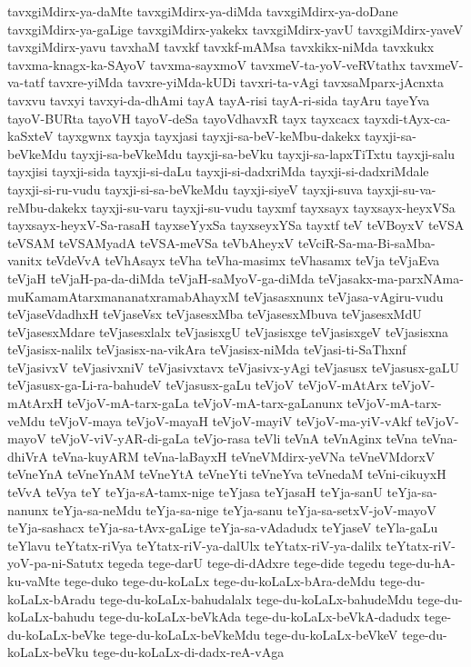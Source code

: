 {tavxgiMdirx-ya-daMte
tavxgiMdirx-ya-diMda
tavxgiMdirx-ya-doDane
tavxgiMdirx-ya-gaLige
tavxgiMdirx-yakekx
tavxgiMdirx-yavU
tavxgiMdirx-yaveV
tavxgiMdirx-yavu
tavxhaM
tavxkf
tavxkf-mAMsa
tavxkikx-niMda
tavxkukx
tavxma-knagx-ka-SAyoV
tavxma-sayxmoV
tavxmeV-ta-yoV-veRVtathx
tavxmeV-va-tatf
tavxre-yiMda
tavxre-yiMda-kUDi
tavxri-ta-vAgi
tavxsaMparx-jAcnxta
tavxvu
tavxyi
tavxyi-da-dhAmi
tayA
tayA-risi
tayA-ri-sida
tayAru
tayeYva
tayoV-BURta
tayoVH
tayoV-deSa
tayoVdhavxR
tayx
tayxcacx
tayxdi-tAyx-ca-kaSxteV
tayxgwnx
tayxja
tayxjasi
tayxji-sa-beV-keMbu-dakekx
tayxji-sa-beVkeMdu
tayxji-sa-beVkeMdu
tayxji-sa-beVku
tayxji-sa-lapxTiTxtu
tayxji-salu
tayxjisi
tayxji-sida
tayxji-si-daLu
tayxji-si-dadxriMda
tayxji-si-dadxriMdale
tayxji-si-ru-vudu
tayxji-si-sa-beVkeMdu
tayxji-siyeV
tayxji-suva
tayxji-su-va-reMbu-dakekx
tayxji-su-varu
tayxji-su-vudu
tayxmf
tayxsayx
tayxsayx-heyxVSa
tayxsayx-heyxV-Sa-rasaH
tayxseYyxSa
tayxseyxYSa
tayxtf
teV
teVBoyxV
teVSA
teVSAM
teVSAMyadA
teVSA-meVSa
teVbAheyxV
teVciR-Sa-ma-Bi-saMba-vanitx
teVdeVvA
teVhAsayx
teVha
teVha-masimx
teVhasamx
teVja
teVjaEva
teVjaH
teVjaH-pa-da-diMda
teVjaH-saMyoV-ga-diMda
teVjasakx-ma-parxNAma-muKamamAtarxmananatxramabAhayxM
teVjasasxnunx
teVjasa-vAgiru-vudu
teVjaseVdadhxH
teVjaseVsx
teVjasesxMba
teVjasesxMbuva
teVjasesxMdU
teVjasesxMdare
teVjasesxlalx
teVjasisxgU
teVjasisxge
teVjasisxgeV
teVjasisxna
teVjasisx-nalilx
teVjasisx-na-vikAra
teVjasisx-niMda
teVjasi-ti-SaThxnf
teVjasivxV
teVjasivxniV
teVjasivxtavx
teVjasivx-yAgi
teVjasusx
teVjasusx-gaLU
teVjasusx-ga-Li-ra-bahudeV
teVjasusx-gaLu
teVjoV
teVjoV-mAtArx
teVjoV-mAtArxH
teVjoV-mA-tarx-gaLa
teVjoV-mA-tarx-gaLanunx
teVjoV-mA-tarx-veMdu
teVjoV-maya
teVjoV-mayaH
teVjoV-mayiV
teVjoV-ma-yiV-vAkf
teVjoV-mayoV
teVjoV-viV-yAR-di-gaLa
teVjo-rasa
teVli
teVnA
teVnAginx
teVna
teVna-dhiVrA
teVna-kuyARM
teVna-laBayxH
teVneVMdirx-yeVNa
teVneVMdorxV
teVneYnA
teVneYnAM
teVneYtA
teVneYti
teVneYva
teVnedaM
teVni-cikuyxH
teVvA
teVya
teY
teYja-sA-tamx-nige
teYjasa
teYjasaH
teYja-sanU
teYja-sa-nanunx
teYja-sa-neMdu
teYja-sa-nige
teYja-sanu
teYja-sa-setxV-joV-mayoV
teYja-sashacx
teYja-sa-tAvx-gaLige
teYja-sa-vAdadudx
teYjaseV
teYla-gaLu
teYlavu
teYtatx-riVya
teYtatx-riV-ya-dalUlx
teYtatx-riV-ya-dalilx
teYtatx-riV-yoV-pa-ni-Satutx
tegeda
tege-darU
tege-di-dAdxre
tege-dide
tegedu
tege-du-hA-ku-vaMte
tege-duko
tege-du-koLaLx
tege-du-koLaLx-bAra-deMdu
tege-du-koLaLx-bAradu
tege-du-koLaLx-bahudalalx
tege-du-koLaLx-bahudeMdu
tege-du-koLaLx-bahudu
tege-du-koLaLx-beVkAda
tege-du-koLaLx-beVkA-dadudx
tege-du-koLaLx-beVke
tege-du-koLaLx-beVkeMdu
tege-du-koLaLx-beVkeV
tege-du-koLaLx-beVku
tege-du-koLaLx-di-dadx-reA-vAga
}
